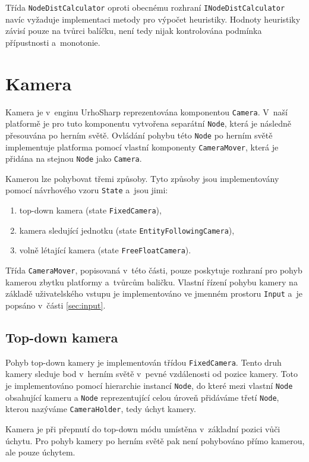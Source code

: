 Třída \texttt{NodeDistCalculator} oproti obecnému rozhraní \texttt{INodeDistCalculator} navíc vyžaduje implementaci metody pro výpočet heuristiky. Hodnoty heuristiky závisí pouze na tvůrci balíčku, není tedy nijak kontrolována podmínka přípustnosti a~monotonie.

\section{Kamera}
\label{sec:camera}
Kamera je v~enginu UrhoSharp reprezentována komponentou \texttt{Camera}. V~naší platformě je pro tuto komponentu vytvořena separátní \texttt{Node}, která je následně přesouvána po herním světě. Ovládání pohybu této \texttt{Node} po herním světě implementuje platforma pomocí vlastní komponenty \texttt{CameraMover}, která je přidána na stejnou \texttt{Node} jako \texttt{Camera}.

Kamerou lze pohybovat třemi způsoby. Tyto způsoby jsou implementovány pomocí návrhového vzoru \texttt{State} \citep[str.~305]{book:gangoffour} a~jsou jimi:
\begin{enumerate}
	\item top-down kamera (state \texttt{FixedCamera}),
	\item kamera sledující jednotku (state \texttt{EntityFollowingCamera}),
	\item volně létající kamera (state \texttt{FreeFloatCamera}).

\end{enumerate}

Třída \texttt{CameraMover}, popisovaná v~této části, pouze poskytuje rozhraní pro pohyb kamerou zbytku platformy a~tvůrcům baličku. Vlastní řízení pohybu kamery na základě uživatelského vstupu je implementováno ve jmenném prostoru \texttt{Input} a~je popsáno v~části \ref{sec:input}. 

\subsection{Top-down kamera}
Pohyb top-down kamery je implementován třídou \texttt{FixedCamera}. Tento druh kamery sleduje bod v~herním světě v~pevné vzdálenosti od pozice kamery. Toto je implementováno pomocí hierarchie instancí \texttt{Node}, do které mezi vlastní \texttt{Node} obsahující kameru a \texttt{Node} reprezentující celou úroveň přidáváme třetí \texttt{Node}, kterou nazýváme \texttt{CameraHolder}, tedy úchyt kamery. 

Kamera je při přepnutí do top-down módu umístěna v~základní pozici vůči úchytu. Pro pohyb kamery po herním světě pak není pohybováno přímo kamerou, ale pouze úchytem.

